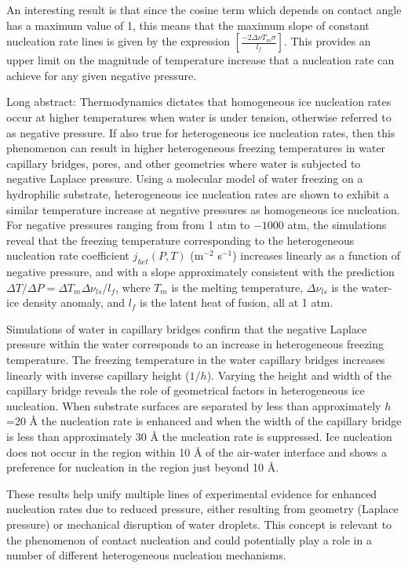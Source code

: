 An interesting result is that since the cosine term which depends on contact angle has a maximum value of 1, this means that the maximum slope of constant nucleation rate lines is given by the expression $\left[\frac{-2 \Delta \nu T_m \sigma}{l_f}\right]$. This provides an upper limit on the magnitude of temperature increase that a nucleation rate can achieve for any given negative pressure.


Long abstract: 
Thermodynamics dictates that homogeneous ice nucleation rates occur at higher temperatures when water is under tension, otherwise referred to as negative pressure. If also true for heterogeneous ice nucleation rates, then this phenomenon can result in higher heterogeneous freezing temperatures in water capillary bridges, pores, and other geometries where water is subjected to negative Laplace pressure. Using a molecular model of water freezing on a hydrophilic substrate, heterogeneous ice nucleation rates are shown to exhibit a similar temperature increase at negative pressures as homogeneous ice nucleation. For negative pressures ranging from from 1 atm to $-1000$ atm, the simulations reveal that the freezing temperature corresponding to the heterogeneous nucleation rate coefficient $j_{het}(P,T)$ (m$^{-2}$ s$^{-1}$) increases linearly as a function of negative pressure, and with a slope approximately consistent with the prediction $\Delta T / \Delta P = \Delta T_m \Delta \nu_{ls} / l_f$, where $T_m$ is the melting temperature, $\Delta \nu_{ls}$ is the water-ice density anomaly, and $l_f$ is the latent heat of fusion, all at 1 atm.

Simulations of water in capillary bridges confirm that the negative Laplace pressure within the water corresponds to an increase in heterogeneous freezing temperature. The freezing temperature in the water capillary bridges increases linearly with inverse capillary height ($1/h$). Varying the height and width of the capillary bridge reveals the role
of geometrical factors in heterogeneous ice nucleation. When substrate surfaces are separated by less than approximately $h$=20 \AA{} the nucleation rate is enhanced and when the width of the capillary bridge is less than approximately 30 \AA{} the nucleation rate is suppressed. Ice nucleation does not occur in the region within 10 \AA{} of the air-water interface and shows a preference for nucleation in the region just beyond 10 \AA{}.

These results help unify multiple lines of experimental evidence for enhanced nucleation rates due to reduced pressure, either resulting from geometry (Laplace pressure) or mechanical disruption of water droplets. This concept is relevant to the phenomenon of contact nucleation and could potentially play a role in a number of different heterogeneous nucleation mechanisms. 